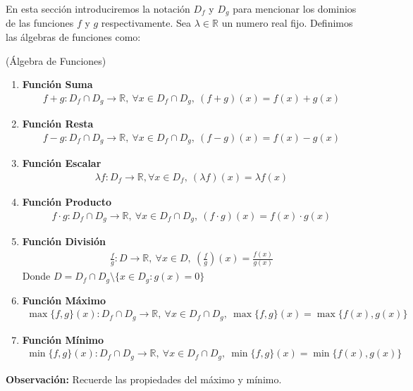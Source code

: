 \documentclass[12pt]{book}
\begin{document}
En esta sección introduciremos la notación $D_f$ y $D_g$ para mencionar los dominios de las funciones $f$ y $g$ respectivamente. Sea $\lambda \in \mathbb{R}$ un numero real fijo. Definimos las álgebras de funciones como:

\begin{defi}{(Álgebra de Funciones)}{}
    \begin{enumerate}
        \item \textbf{Función Suma}
\begin{align*}
    f+g : D_f \cap D_g  \to \mathbb{R}, \ \forall x \in  D_f \cap D_g, \ (f+g)(x)=f(x)+g(x)
\end{align*}

        \item \textbf{Función Resta}
\begin{align*}
    f-g : D_f \cap D_g \to \mathbb{R}, \ \forall x \in  D_f \cap D_g, \ (f-g)(x)=f(x)-g(x)
\end{align*}

\item \textbf{Función Escalar}
\begin{align*}
    \lambda f : D_f \to \mathbb{R} , \forall x \in  D_f,  \ (\lambda f )(x)=\lambda f(x)
\end{align*}

\item \textbf{Función Producto}
\begin{align*}
    f \cdot g : D_f \cap D_g \to \mathbb{R}, \ \forall x \in  D_f \cap D_g, \ (f\cdot g)(x)=f(x)\cdot g(x)
\end{align*}
\item \textbf{Función División}
\begin{align*}
    \frac{f}{g} : D \to \mathbb{R}, \ \forall x \in D, \ \left( \frac{f}{g}\right)(x)=\frac{f(x)}{g(x)}
\end{align*}
Donde $D= D_f \cap D_g  \setminus \{ x \in D_g : g(x)=0 \} $

\item \textbf{Función Máximo}
\begin{align*}
\max\{f,g\}(x) : D_f \cap D_g \to \mathbb{R},  \ \forall x \in  D_f \cap D_g, \  \max\{f,g\}(x)= \max\{f(x),g(x)\}
\end{align*}
\item \textbf{Función Mínimo}
\begin{align*}
\min\{f,g\}(x) : D_f \cap D_g \to \mathbb{R},  \ \forall x \in  D_f \cap D_g, \  \min\{f,g\}(x)= \min\{f(x),g(x)\}
\end{align*}
    \end{enumerate}
\end{defi}
\textbf{Observación:} Recuerde las propiedades del máximo y mínimo.
\end{document}
